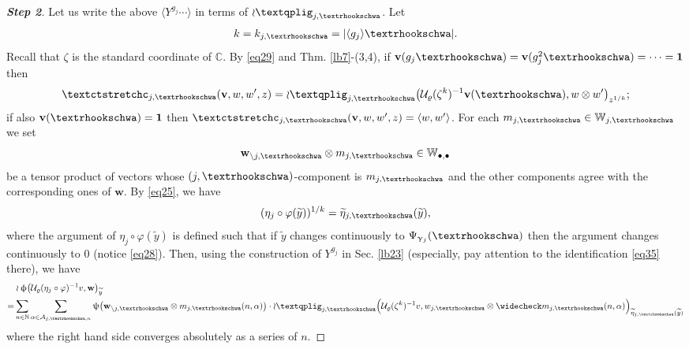 \documentclass[12pt,a4paper,notitlepage]{article}
\theoremstyle{definition}
\theoremstyle{plain}
\newcommand{\mc}{\mathcal}
\newcommand{\wtd}{\widetilde}
\newcommand{\wch}{\widecheck}
\newcommand{\id}{\mathbf{1}}
\newcommand{\bk}[1]{\langle {#1}\rangle}
\newcommand{\blt}{\bullet}
\newcommand{\Wbb}{\mathbb W}
\newcommand{\Cbb}{\mathbb C}
\newcommand{\Nbb}{\mathbb N}
\newcommand{\vbf}{\mathbf v}
\newcommand{\wbf}{\mathbf w}
\newcommand{\tipae}{\text{\textrhookschwa}}
\newcommand{\tipxcc}{\text{\textctstretchc}}
\newcommand{\tipxphi}{\text{\textqplig}}
\numberwithin{equation}{subsection}
\begin{document}
\begin{proof}[\textbf{Step 2}]
Let us write the above $\bk{Y^{g_j}\cdots}$ in terms of $\wr\tipxphi_{j,\tipae}$. Let
\begin{align*}
	k=k_{j,\tipae}=|\bk{g_j}\tipae|.	
\end{align*}
Recall that $\zeta$ is the standard coordinate of $\Cbb$. By \eqref{eq29} and Thm. \ref{lb7}-(3,4), if $\vbf(g_j\tipae)=\vbf(g_j^2\tipae)=\cdots=\id$ then
\begin{align*}
\tipxcc_{j,\tipae}(\vbf,w,w',z)=\wr\tipxphi_{j,\tipae}\big(\mc U_\varrho(\zeta^k)^{-1}\vbf(\tipae),w\otimes w'\big)_{z^{1/k}};	
\end{align*}
if also $\vbf(\tipae)=\id$ then $\tipxcc_{j,\tipae}(\vbf,w,w',z)=\bk{w,w'}$.  For each $m_{j,\tipae}\in\Wbb_{j,\tipae}$ we set
\begin{align*}
\wbf_{\setminus j,\tipae}\otimes m_{j,\tipae}\in\Wbb_{\blt,\blt}	
\end{align*}
be a tensor product of vectors whose $(j,\tipae)$-component is $m_{j,\tipae}$ and the other components agree with the corresponding ones of $\wbf$. By \eqref{eq25}, we have
\begin{align*}
(\eta_j\circ\varphi(\wtd y))^{1/k}=\wtd\eta_{j,\tipae}(\wtd y),
\end{align*}
where the argument of $\eta_j\circ\varphi(\wtd y)$ is defined  such that if $\wtd y$ changes continuously to $\Psi_{\upgamma_j}(\tipae)$ then the argument changes continuously to $0$ (notice \eqref{eq28}). Then, using the construction of  $Y^{g_j}$ in Sec. \ref{lb23} (especially, pay attention to the identification \eqref{eq35} there), we have
\begin{align}
&\wr\upphi\big(\mc U_\varrho(\eta_j\circ\varphi)^{-1}v,\wbf\big)_{\wtd y}\nonumber\\
=&\sum_{n\in\Nbb}\sum_{\alpha\in\mc A_{j,\tipae,n}}\uppsi\big(\wbf_{\setminus j,\tipae}\otimes m_{j,\tipae}(n,\alpha) \big)\cdot \wr\tipxphi_{j,\tipae}\Big(\mc U_\varrho(\zeta^k)^{-1}v,w_{j,\tipae}\otimes\wch m_{j,\tipae}(n,\alpha)\Big)_{\wtd\eta_{j,\tipae}(\wtd y)}\label{eq51}	
\end{align}
where the right hand side converges absolutely as a series of $n$.


\end{proof}
\end{document}
